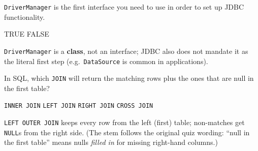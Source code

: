\begin{solution}
\begin{center}
  \end{center}
\end{solution}

\question[4]
\texttt{DriverManager} is the first interface you need to use in order to set up JDBC functionality.
\begin{choices}
  \choice TRUE
  \CorrectChoice FALSE
\end{choices}
\begin{solution}
  \texttt{DriverManager} is a \textbf{class}, not an interface; JDBC also does not mandate it as the literal first step (e.g.\ \texttt{DataSource} is common in applications).
\end{solution}

\question[4]
In SQL, which \lstinline[style=sqlinline]!JOIN! will return the matching rows plus the ones that are null in the first table?
\begin{choices}
  \choice \lstinline[style=sqlinline]!INNER JOIN!
  \CorrectChoice \lstinline[style=sqlinline]!LEFT JOIN!
  \choice \lstinline[style=sqlinline]!RIGHT JOIN!
  \choice \lstinline[style=sqlinline]!CROSS JOIN!
\end{choices}
\begin{solution}
  \texttt{LEFT OUTER JOIN} keeps every row from the left (first) table; non-matches get \texttt{NULL}s from the right side. (The stem follows the original quiz wording: ``null in the first table'' means nulls \emph{filled in} for missing right-hand columns.)
\end{solution}



